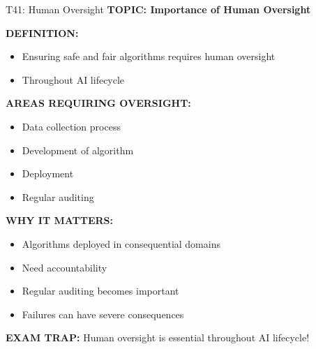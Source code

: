\documentclass[8pt]{beamer}
\begin{document}
	\begin{frame}{T41: Human Oversight}
		\fontsize{6.5}{7.5}\selectfont
		\textbf{TOPIC: Importance of Human Oversight}
		
		\vspace{0.1cm}
		\textbf{DEFINITION:}
		\begin{itemize}
			\item Ensuring safe and fair algorithms requires human oversight
			\item Throughout AI lifecycle
		\end{itemize}
		
		\vspace{0.1cm}
		\textbf{AREAS REQUIRING OVERSIGHT:}
		\begin{itemize}
			\item Data collection process
			\item Development of algorithm
			\item Deployment
			\item Regular auditing
		\end{itemize}
		
		\vspace{0.1cm}
		\textbf{WHY IT MATTERS:}
		\begin{itemize}
			\item Algorithms deployed in consequential domains
			\item Need accountability
			\item Regular auditing becomes important
			\item Failures can have severe consequences
		\end{itemize}
		
		\textcolor{myred}{\textbf{EXAM TRAP:}} Human oversight is \textcolor{myblue}{essential throughout AI lifecycle}!
	\end{frame}
	
\end{document}
